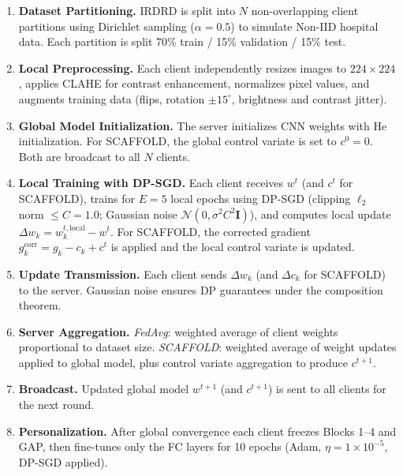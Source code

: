 \documentclass[10pt, conference]{IEEEtran}
\begin{document}
\begin{enumerate}[leftmargin=*, label=\textbf{Step \arabic*.}, itemsep=2pt]

\item \textbf{Dataset Partitioning.}
IRDRD is split into $N$ non-overlapping client partitions using Dirichlet
sampling ($\alpha=0.5$) to simulate Non-IID hospital data. Each partition is
split 70\% train / 15\% validation / 15\% test.

\item \textbf{Local Preprocessing.}
Each client independently resizes images to $224\times224$, applies CLAHE for
contrast enhancement, normalizes pixel values, and augments training data (flips,
rotation $\pm15^{\circ}$, brightness and contrast jitter).

\item \textbf{Global Model Initialization.}
The server initializes CNN weights with He initialization. For SCAFFOLD, the
global control variate is set to $c^0=0$. Both are broadcast to all $N$ clients.

\item \textbf{Local Training with DP-SGD.}
Each client receives $w^t$ (and $c^t$ for SCAFFOLD), trains for $E=5$ local
epochs using DP-SGD (clipping $\ell_2$ norm $\leq C=1.0$; Gaussian noise
$\mathcal{N}(0,\sigma^2 C^2\mathbf{I})$), and computes local update
$\Delta w_k = w_k^{t,\mathrm{local}}-w^t$. For SCAFFOLD, the corrected gradient
$g_k^{\mathrm{corr}}=g_k-c_k+c^t$ is applied and the local control variate is
updated.

\item \textbf{Update Transmission.}
Each client sends $\Delta w_k$ (and $\Delta c_k$ for SCAFFOLD) to the server.
Gaussian noise ensures DP guarantees under the composition theorem.

\item \textbf{Server Aggregation.}
\textit{FedAvg}: weighted average of client weights proportional to dataset size.
\textit{SCAFFOLD}: weighted average of weight updates applied to global model,
plus control variate aggregation to produce $c^{t+1}$.

\item \textbf{Broadcast.}
Updated global model $w^{t+1}$ (and $c^{t+1}$) is sent to all clients for the
next round.

\item \textbf{Personalization.}
After global convergence each client freezes Blocks 1--4 and GAP, then
fine-tunes only the FC layers for 10 epochs (Adam, $\eta=1\times10^{-5}$,
DP-SGD applied).

\end{enumerate}
\end{document}
